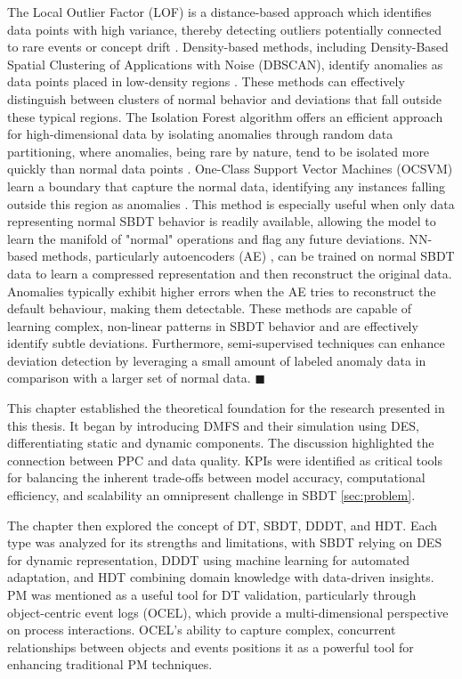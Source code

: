 The Local Outlier Factor (LOF) is a distance-based approach which identifies data points with high variance, thereby detecting outliers potentially connected to rare events or concept drift \autocite{alghushairy2020review}. Density-based methods, including Density-Based Spatial Clustering of Applications with Noise (DBSCAN), identify anomalies as data points placed in low-density regions \autocite{ccelik2011anomaly}. These methods can effectively distinguish between clusters of normal behavior and deviations that fall outside these typical regions.
The Isolation Forest algorithm offers an efficient approach for high-dimensional data by isolating anomalies through random data partitioning, where anomalies, being rare by nature, tend to be isolated more quickly than normal data points \autocite{xu2017improved}.
One-Class Support Vector Machines (OCSVM) learn a boundary that capture the normal data, identifying any instances falling outside this region as anomalies \autocite{li2003improving}. This method is especially useful when only data representing normal SBDT behavior is readily available, allowing the model to learn the manifold of "normal" operations and flag any future deviations. NN-based methods, particularly autoencoders (AE) \autocite{zhou2017anomaly}, can be trained on normal SBDT data to learn a compressed representation and then reconstruct the original data. Anomalies typically exhibit higher errors when the AE tries to reconstruct the default behaviour, making them detectable. These methods are capable of learning complex, non-linear patterns in SBDT behavior and are effectively identify subtle deviations. Furthermore, semi-supervised techniques can enhance deviation detection by leveraging a small amount of labeled anomaly data in comparison with a larger set of normal data. \(\blacksquare\)

This chapter established the theoretical foundation for the research presented in this thesis. It began by introducing DMFS and their simulation using DES, differentiating static and dynamic components. The discussion highlighted the connection between PPC and data quality. KPIs were identified as critical tools for balancing the inherent trade-offs between model accuracy, computational efficiency, and scalability \textemdash an omnipresent challenge in SBDT \autoref{sec:problem}.

The chapter then explored the concept of DT, SBDT, DDDT, and HDT. Each type was analyzed for its strengths and limitations, with SBDT relying on DES for dynamic representation, DDDT using machine learning for automated adaptation, and HDT combining domain knowledge with data-driven insights. PM was mentioned as a useful tool for DT validation, particularly through object-centric event logs (OCEL), which provide a multi-dimensional perspective on process interactions. OCEL’s ability to capture complex, concurrent relationships between objects and events positions it as a powerful tool for enhancing traditional PM techniques.

